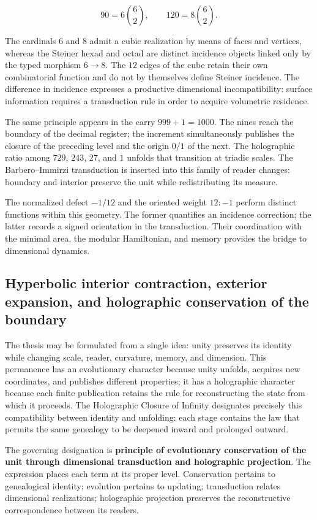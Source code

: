 \[
90=6\binom62,
\qquad
120=8\binom62.
\]

The cardinals \(6\) and \(8\) admit a cubic realization by means of faces and vertices, whereas the Steiner hexad and octad are distinct incidence objects linked only by the typed morphism \(6\to8\). The \(12\) edges of the cube retain their own combinatorial function and do not by themselves define Steiner incidence. The difference in incidence expresses a productive dimensional incompatibility: surface information requires a transduction rule in order to acquire volumetric residence.

The same principle appears in the carry \(999+1=1000\). The nines reach the boundary of the decimal register; the increment simultaneously publishes the closure of the preceding level and the origin \(0/1\) of the next. The holographic ratio among \(729\), \(243\), \(27\), and \(1\) unfolds that transition at triadic scales. The Barbero–Immirzi transduction is inserted into this family of reader changes: boundary and interior preserve the unit while redistributing its measure.

The normalized defect \(-1/12\) and the oriented weight \(12:-1\) perform distinct functions within this geometry. The former quantifies an incidence correction; the latter records a signed orientation in the transduction. Their coordination with the minimal area, the modular Hamiltonian, and memory provides the bridge to dimensional dynamics.

\subsection{Hyperbolic interior contraction, exterior expansion, and holographic conservation of the boundary}

The thesis may be formulated from a single idea: unity preserves its identity while changing scale, reader, curvature, memory, and dimension. This permanence has an evolutionary character because unity unfolds, acquires new coordinates, and publishes different properties; it has a holographic character because each finite publication retains the rule for reconstructing the state from which it proceeds. The Holographic Closure of Infinity designates precisely this compatibility between identity and unfolding: each stage contains the law that permits the same genealogy to be deepened inward and prolonged outward.

The governing designation is \textbf{principle of evolutionary conservation of the unit through dimensional transduction and holographic projection}. The expression places each term at its proper level. Conservation pertains to genealogical identity; evolution pertains to updating; transduction relates dimensional realizations; holographic projection preserves the reconstructive correspondence between its readers.

